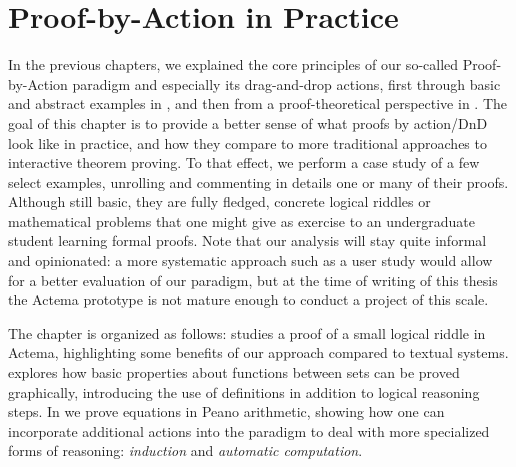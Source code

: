 \setchapterpreamble[u]{\margintoc}
\chapter{Proof-by-Action in Practice}

In the previous chapters, we explained the core principles of our so-called
Proof-by-Action paradigm and especially its drag-and-drop actions, first through
basic and abstract examples in , and then from a proof-theoretical
perspective in . The goal of this chapter is to provide a better
sense of what proofs by action/DnD look like in practice, and how they compare
to more traditional approaches to interactive theorem proving. To that effect,
we perform a case study of a few select examples, unrolling and commenting in
details one or many of their proofs. Although still basic, they are fully
fledged, concrete logical riddles or mathematical problems that one might give
as exercise to an undergraduate student learning formal proofs. Note that our
analysis will stay quite informal and opinionated: a more systematic approach
such as a user study would allow for a better evaluation of our paradigm, but at
the time of writing of this thesis the Actema prototype is not mature enough to
conduct a project of this scale.

The chapter is organized as follows:  studies a proof of a small
logical riddle in Actema, highlighting some benefits of our approach compared to
textual systems.  explores how basic properties about functions
between sets can be proved graphically, introducing the use of definitions in
addition to logical reasoning steps. In  we prove equations in
Peano arithmetic, showing how one can incorporate additional actions into the
paradigm to deal with more specialized forms of reasoning: \emph{induction} and
\emph{automatic computation}.



